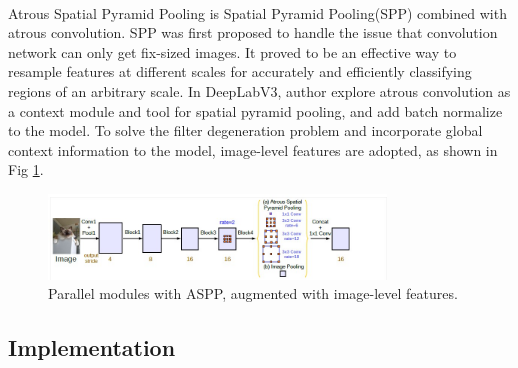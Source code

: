 \paragraph{}
Atrous Spatial Pyramid Pooling is Spatial Pyramid Pooling(SPP) combined with atrous convolution. SPP was first proposed to handle the issue that convolution network can only get fix-sized images\cite{spp}. It proved to be an effective way to resample features at different scales for accurately and efficiently classifying regions of an arbitrary scale. In DeepLabV3, author explore atrous convolution as a context module and tool for spatial pyramid pooling, and add batch normalize to the model. To solve the filter degeneration problem and incorporate global context information to the model, image-level features are adopted, as shown in Fig \ref{fig:aspp}.

\begin{figure}
    \centering
    \includegraphics[width=0.8\textwidth]{Section3/aspp.jpg}
    \caption{Parallel modules with ASPP, augmented with image-level features.}
    \label{fig:aspp}
\end{figure}

\subsection{Implementation}
